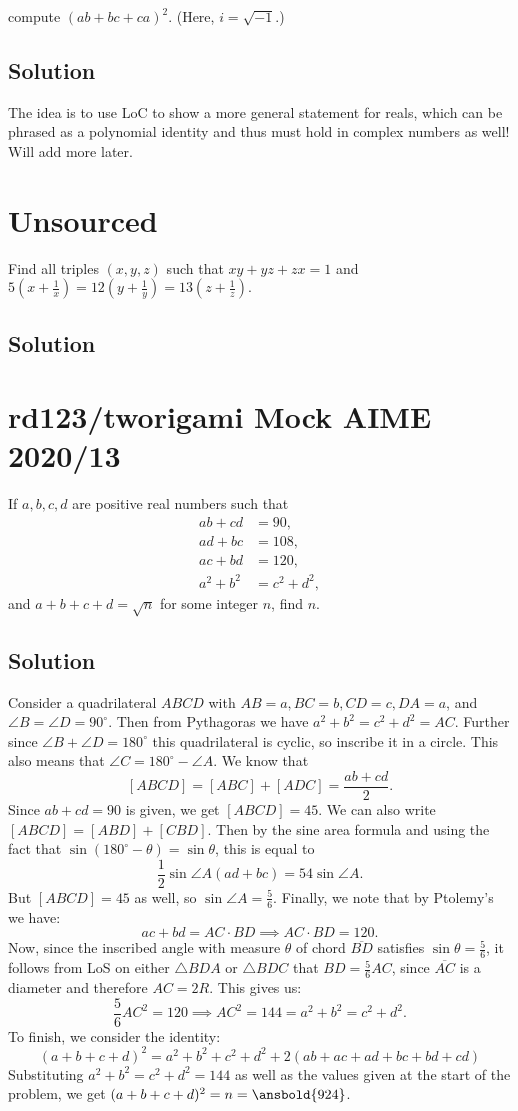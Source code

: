 \documentclass{article}
\begin{document}
compute $(ab+bc+ca)^2$. (Here, $i=\sqrt{-1}$.)

\subsection{Solution}
The idea is to use LoC to show a more general statement for reals, which can be phrased as a polynomial identity and thus must hold in complex numbers as well! Will add more later.

\pagebreak\section{Unsourced}
Find all triples $(x,y,z)$ such that $xy+yz+zx=1$ and $5(x+\frac{1}{x})=12(y+\frac{1}{y})=13(z+\frac{1}{z}).$

\subsection{Solution}

\pagebreak\section{rd123/tworigami Mock AIME 2020/13}
If $a,b,c,d$ are positive real numbers such that
\begin{align*} ab + cd &= 90, \\ ad + bc &= 108, \\ ac + bd &= 120, \\ a^2+b^2 &= c^2+d^2, \end{align*}and $a+b+c+d=\sqrt{n}$ for some integer $n$, find $n$.

\subsection{Solution}
Consider a quadrilateral $ABCD$ with $AB=a,BC=b,CD=c,DA=a$, and $\angle B=\angle D=90^\circ$. Then from Pythagoras we have $a^2+b^2=c^2+d^2=AC$. Further since $\angle B+\angle D=180^\circ$ this quadrilateral is cyclic, so inscribe it in a circle. This also means that $\angle C=180^\circ-\angle A$. We know that
$$[ABCD]=[ABC]+[ADC]=\frac{ab+cd}{2}.$$
Since $ab+cd=90$ is given, we get $[ABCD]=45$. We can also write $[ABCD]=[ABD]+[CBD]$. Then by the sine area formula and using the fact that $\sin(180^\circ - \theta) = \sin \theta$, this is equal to
$$\frac{1}{2}\sin \angle A (ad+bc)=54 \sin \angle A.$$
But $[ABCD]=45$ as well, so $\sin \angle A=\frac{5}{6}$. Finally, we note that by Ptolemy's we have:
$$ac+bd=AC\cdot BD \implies AC \cdot BD=120.$$
Now, since the inscribed angle with measure $\theta$ of chord $\overline{BD}$ satisfies $\sin \theta = \frac{5}{6}$, it follows from LoS on either $\triangle BDA$ or $\triangle BDC$ that $BD=\frac{5}{6}AC$, since $\overline{AC}$ is a diameter and therefore $AC=2R$. This gives us:
$$\frac{5}{6}AC^2=120 \implies AC^2=144=a^2+b^2=c^2+d^2.$$
To finish, we consider the identity:
$$(a+b+c+d)^2=a^2+b^2+c^2+d^2+2(ab+ac+ad+bc+bd+cd)$$
Substituting $a^2+b^2=c^2+d^2=144$ as well as the values given at the start of the problem, we get $(a+b+c+d)^2=n=\ansbold{924}$.
\end{document}
